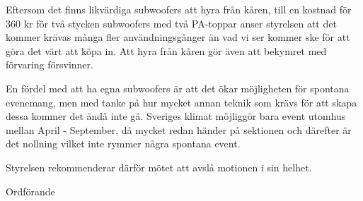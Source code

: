 \documentclass[../_main/handlingar.tex]{subfiles}
\begin{document}
\motionssvar

Eftersom det finns likvärdiga subwoofers att hyra från kåren, till en kostnad för 360 kr för två stycken subwoofers med två PA-toppar anser styrelsen att det kommer krävas många fler användningsgånger än vad vi ser kommer ske för att göra det värt att köpa in. Att hyra från kåren gör även att bekymret med förvaring försvinner. 

En fördel med att ha egna subwoofers är att det ökar möjligheten för spontana evenemang, men med tanke på hur mycket annan teknik som krävs för att skapa dessa kommer det ändå inte gå. Sveriges klimat möjliggör bara event utomhus mellan April - September, då mycket redan händer på sektionen och därefter är det nollning vilket inte rymmer några spontana event. 

Styrelsen rekommenderar därför mötet att avslå motionen i sin helhet. 

\begin{signatures}{1}
    \ist
    \signature{\ordf}{Ordförande}
\end{signatures}
\end{document}
